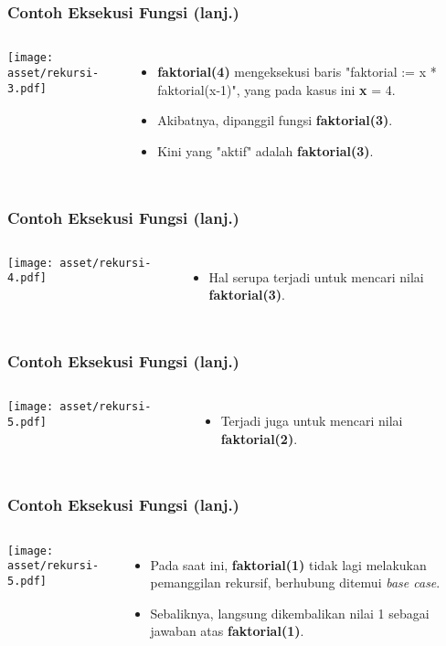 \begin{frame}
\frametitle{Contoh Eksekusi Fungsi (lanj.)}
\begin{columns}
    \centering
    \texttt{[image: asset/rekursi-3.pdf]}
    \begin{itemize}
      \item \textbf{faktorial(4)} mengeksekusi baris "faktorial := x * faktorial(x-1)", yang pada kasus ini \textbf{x} = 4.
      \item Akibatnya, dipanggil fungsi \textbf{faktorial(3)}. 
      \item Kini yang "aktif" adalah \textbf{faktorial(3)}.
    \end{itemize}
  \end{columns} 
\end{frame}

\begin{frame}
\frametitle{Contoh Eksekusi Fungsi (lanj.)}
\begin{columns}
    \centering
    \texttt{[image: asset/rekursi-4.pdf]}
    \begin{itemize}
      \item Hal serupa terjadi untuk mencari nilai \textbf{faktorial(3)}.
    \end{itemize}
  \end{columns} 
\end{frame}

\begin{frame}
\frametitle{Contoh Eksekusi Fungsi (lanj.)}
\begin{columns}
    \centering
    \texttt{[image: asset/rekursi-5.pdf]}
    \begin{itemize}
      \item Terjadi juga untuk mencari nilai \textbf{faktorial(2)}.
    \end{itemize}
  \end{columns} 
\end{frame}

\begin{frame}
\frametitle{Contoh Eksekusi Fungsi (lanj.)}
\begin{columns}
    \centering
    \texttt{[image: asset/rekursi-5.pdf]}
    \begin{itemize}
      \item Pada saat ini, \textbf{faktorial(1)} tidak lagi melakukan pemanggilan rekursif, berhubung ditemui \textit{base case}.
      \item Sebaliknya, langsung dikembalikan nilai 1 sebagai jawaban atas \textbf{faktorial(1)}.
    \end{itemize}
  \end{columns} 
\end{frame}

